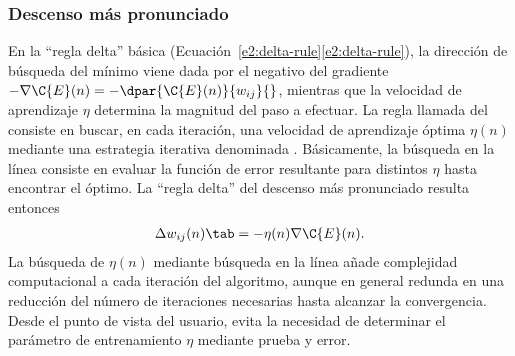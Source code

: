 %
\subsubsection{Descenso más pronunciado}
%
En la ``regla delta'' básica
(\iflatexml{}Ecuación~\ref{e2:delta-rule}\else\autoref{e2:delta-rule}\fi),
la dirección de búsqueda del mínimo
viene dada por el negativo del gradiente
$-\nabla\C{E}(n)=-\dpar{\C{E}(n)}{w_{ij}}{}$, mientras que la
velocidad de aprendizaje $\eta$ determina la magnitud del paso a
efectuar.
La regla llamada del  consiste
en buscar, en cada iteración, una velocidad de aprendizaje óptima
$\eta(n)$ mediante una estrategia iterativa denominada .  Básicamente, la búsqueda en la línea consiste en evaluar
la función de error resultante para distintos $\eta$ hasta encontrar
el óptimo.  La ``regla delta'' del descenso más pronunciado resulta
entonces
%
\begin{align}\label{e2:delta-rule-steepest}
  \Delta w_{ij}(n)\tab=-\eta(n)\nabla{\C{E}(n)}.
\end{align}
%
La búsqueda de $\eta(n)$ mediante búsqueda en la línea añade
complejidad computacional a cada iteración del algoritmo, aunque en
general redunda en una reducción del número de iteraciones necesarias
hasta alcanzar la convergencia.  Desde el punto de vista del usuario,
evita la necesidad de determinar el parámetro de entrenamiento $\eta$
mediante prueba y error.
